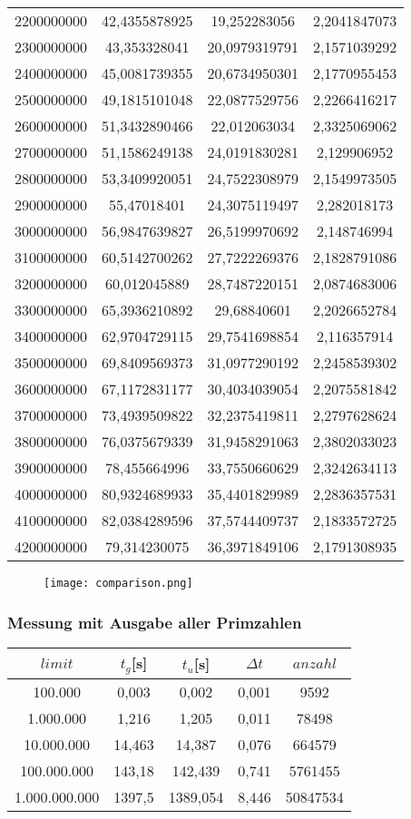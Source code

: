 \documentclass[a4paper,12pt]{article}
\begin{document}
\begin{tabular}{|c|c|c|c|}
2200000000 & 42,4355878925 & 19,252283056 & 2,2041847073\\
2300000000 & 43,353328041 & 20,0979319791 & 2,1571039292\\
2400000000 & 45,0081739355 & 20,6734950301 & 2,1770955453\\
2500000000 & 49,1815101048 & 22,0877529756 & 2,2266416217\\
2600000000 & 51,3432890466 & 22,012063034 & 2,3325069062\\
2700000000 & 51,1586249138 & 24,0191830281 & 2,129906952\\
2800000000 & 53,3409920051 & 24,7522308979 & 2,1549973505\\
2900000000 & 55,47018401 & 24,3075119497 & 2,282018173\\
3000000000 & 56,9847639827 & 26,5199970692 & 2,148746994\\
3100000000 & 60,5142700262 & 27,7222269376 & 2,1828791086\\
3200000000 & 60,012045889 & 28,7487220151 & 2,0874683006\\
3300000000 & 65,3936210892 & 29,68840601 & 2,2026652784\\
3400000000 & 62,9704729115 & 29,7541698854 & 2,116357914\\
3500000000 & 69,8409569373 & 31,0977290192 & 2,2458539302\\
3600000000 & 67,1172831177 & 30,4034039054 & 2,2075581842\\
3700000000 & 73,4939509822 & 32,2375419811 & 2,2797628624\\
3800000000 & 76,0375679339 & 31,9458291063 & 2,3802033023\\
3900000000 & 78,455664996 & 33,7550660629 & 2,3242634113\\
4000000000 & 80,9324689933 & 35,4401829989 & 2,2836357531\\
4100000000 & 82,0384289596 & 37,5744409737 & 2,1833572725\\
4200000000 & 79,314230075 & 36,3971849106 & 2,1791308935\\
\hline
\end{tabular}

\begin{figure}
\texttt{[image: comparison.png]}
\end{figure}


\subsubsection{Messung mit Ausgabe aller Primzahlen}
\begin{tabular}{|c|c|c|c|c|}
\hline
$limit$ & $t_g$[s] & $t_u$[s] & $\Delta t$ & $anzahl$ \\
\hline
100.000 & 0,003 & 0,002 & 0,001 & 9592\\
1.000.000 & 1,216 & 1,205 & 0,011 & 78498\\
10.000.000 & 14,463 & 14,387 & 0,076 & 664579\\
100.000.000 & 143,18 & 142,439 & 0,741 & 5761455\\
1.000.000.000 & 1397,5 & 1389,054 & 8,446 & 50847534\\
\hline
\end{tabular}
\end{document}
